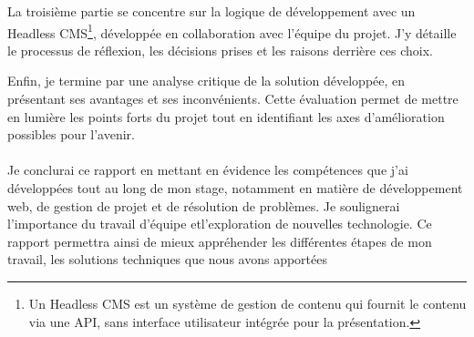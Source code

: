 La troisième partie se concentre sur la logique de développement avec un Headless CMS\footnote{Un Headless CMS est un système de gestion de contenu qui fournit le contenu via une API, sans interface utilisateur intégrée pour la présentation.}, développée en collaboration avec l'équipe du projet. J'y détaille le processus de réflexion, les décisions prises et les raisons derrière ces choix.


Enfin, je termine par une analyse critique de la solution développée, en présentant ses avantages et ses inconvénients. Cette évaluation permet de mettre en lumière les points forts du projet tout en identifiant les axes d'amélioration possibles pour l'avenir.
\\ \\
Je conclurai ce rapport en mettant en évidence les compétences que j'ai développées tout au long de mon stage, notamment en matière de développement web, de gestion de projet et de résolution de problèmes. Je soulignerai l'importance du travail d'équipe etl'exploration de nouvelles technologie. Ce rapport permettra ainsi de mieux appréhender les différentes étapes de mon travail, les solutions techniques que nous avons apportées